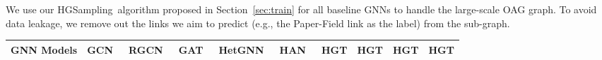 \documentclass[sigconf]{acmart}
\theoremstyle{definition}
\newcommand{\short}{HGT}
\newcommand{\sampling}{HGSampling}
\begin{document}
We use our \sampling\ algorithm proposed in Section~\ref{sec:train} for all baseline GNNs to handle the large-scale OAG graph. To avoid data leakage, we remove out the links we aim to predict (e.g., the Paper-Field link as the label) from the sub-graph.





\begin{table*}[!tp]
\centering
\small
\renewcommand\arraystretch{1.3}
\setlength{\tabcolsep}{3pt}
\begin{tabular}{c|c|c|ccccc|cccc} 
\toprule
\multicolumn{3}{c|}{GNN Models} & GCN~\cite{gcn}  & RGCN~\cite{DBLP:conf/esws/SchlichtkrullKB18}& GAT~\cite{gat}& HetGNN~\cite{DBLP:conf/kdd/ZhangSHSC19} & HAN~\cite{DBLP:conf/www/WangJSWYCY19} &{ \short} & \short & \short & \short \\ \midrule


\end{tabular}
\end{table*}
\end{document}
